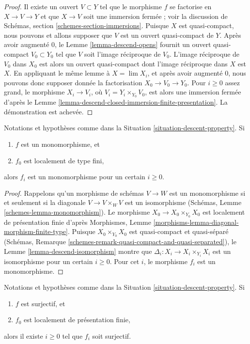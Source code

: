 \begin{proof}
Il existe un ouvert $V \subset Y$ tel que le morphisme $f$ se factorise en
$X \to V \to Y$ et que $X \to V$ soit une immersion fermée ; voir la
discussion de Schémas, section \ref{schemes-section-immersions}. Puisque $X$
est quasi-compact, nous pouvons et allons supposer que $V$ est un ouvert
quasi-compact de $Y$. Après avoir augmenté $0$, le
Lemme \ref{lemma-descend-opens} fournit un ouvert quasi-compact
$V_0 \subset Y_0$ tel que $V$ soit l'image réciproque de $V_0$. L'image réciproque de
$V_0$ dans $X_0$ est alors un ouvert quasi-compact dont l'image réciproque
dans $X$ est $X$. En appliquant le même lemme à $X = \lim X_i$, et après
avoir augmenté $0$, nous pouvons donc supposer donnée la factorisation
$X_0 \to V_0 \to Y_0$. Pour $i \geq 0$ assez grand, le morphisme
$X_i \to V_i$, où $V_i = Y_i \times_{Y_0} V_0$, est alors une immersion
fermée d'après le
Lemme \ref{lemma-descend-closed-immersion-finite-presentation}. La
démonstration est achevée.
\end{proof}

\begin{lemma}
\label{lemma-descend-monomorphism}
Notations et hypothèses comme dans la
Situation \ref{situation-descent-property}. Si
\begin{enumerate}
\item $f$ est un monomorphisme, et
\item $f_0$ est localement de type fini,
\end{enumerate}
alors $f_i$ est un monomorphisme pour un certain $i \geq 0$.
\end{lemma}

\begin{proof}
Rappelons qu'un morphisme de schémas $V \to W$ est un monomorphisme si et
seulement si la diagonale $V \to V \times_W V$ est un isomorphisme (Schémas,
Lemme \ref{schemes-lemma-monomorphism}). Le morphisme
$X_0 \to X_0 \times_{Y_0} X_0$ est localement de présentation finie d'après
Morphismes, Lemme \ref{morphisms-lemma-diagonal-morphism-finite-type}.
Puisque $X_0 \times_{Y_0} X_0$ est quasi-compact et quasi-séparé (Schémas,
Remarque \ref{schemes-remark-quasi-compact-and-quasi-separated}), le
Lemme \ref{lemma-descend-isomorphism} montre que
$\Delta_i : X_i \to X_i \times_{Y_i} X_i$ est un isomorphisme pour un
certain $i \geq 0$. Pour cet $i$, le morphisme $f_i$ est un monomorphisme.
\end{proof}

\begin{lemma}
\label{lemma-descend-surjective}
Notations et hypothèses comme dans la
Situation \ref{situation-descent-property}. Si
\begin{enumerate}
\item $f$ est surjectif, et
\item $f_0$ est localement de présentation finie,
\end{enumerate}
alors il existe $i \geq 0$ tel que $f_i$ soit surjectif.
\end{lemma}

